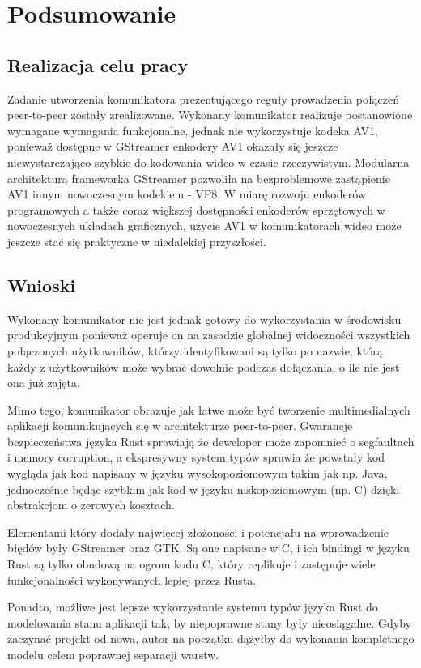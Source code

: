 \chapter{Podsumowanie}
\label{chap:podsumowanie}
\section{Realizacja celu pracy}

Zadanie utworzenia komunikatora prezentującego reguły prowadzenia połączeń peer-to-peer zostały
zrealizowane. Wykonany komunikator realizuje postanowione wymagane wymagania funkcjonalne, jednak
nie wykorzystuje kodeka AV1, ponieważ dostępne w GStreamer enkodery AV1 okazały się jeszcze
niewystarczająco szybkie do kodowania wideo w czasie rzeczywistym. Modularna architektura frameworka
GStreamer pozwoliła na bezproblemowe zastąpienie AV1 innym nowoczesnym kodekiem - VP8. W miarę
rozwoju enkoderów programowych a także coraz większej dostępności enkoderów sprzętowych w
nowoczesnych układach graficznych, użycie AV1 w komunikatorach wideo może jeszcze stać się
praktyczne w niedalekiej przyszłości.

\section{Wnioski}

Wykonany komunikator nie jest jednak gotowy do wykorzystania w środowisku produkcyjnym
ponieważ operuje on na zasadzie globalnej widoczności wszystkich połączonych użytkowników, którzy
identyfikowani są tylko po nazwie, którą każdy z użytkowników może wybrać dowolnie podczas
dołączania, o ile nie jest ona już zajęta.

Mimo tego, komunikator obrazuje jak łatwe może być tworzenie multimedialnych aplikacji
komunikujących się w architekturze peer-to-peer. Gwarancje bezpieczeństwa języka Rust sprawiają że
deweloper może zapomnieć o segfaultach i memory corruption, a ekspresywny system typów sprawia że
powstały kod wygląda jak kod napisany w języku wysokopoziomowym takim jak np. Java, jednocześnie
będąc szybkim jak kod w języku niskopoziomowym (np. C) dzięki abstrakcjom o zerowych kosztach.

Elementami który dodały najwięcej złożoności i potencjału na wprowadzenie błędów były GStreamer oraz
GTK. Są one napisane w C, i ich bindingi w języku Rust są tylko obudową na ogrom kodu C, który
replikuje i zastępuje wiele funkcjonalności wykonywanych lepiej przez Rusta.

Ponadto, możliwe jest lepsze wykorzystanie systemu typów języka Rust do modelowania stanu aplikacji
tak, by niepoprawne stany były nieosiągalne. Gdyby zaczynać projekt od nowa, autor na początku
dążyłby do wykonania kompletnego modelu celem poprawnej separacji warstw.

